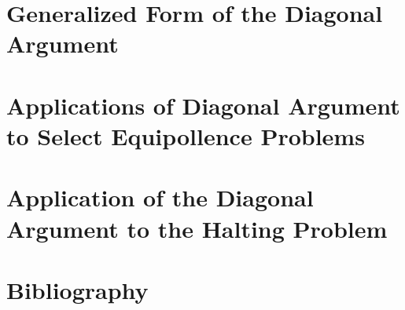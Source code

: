 \documentclass[12pt]{article}
\theoremstyle{plain}
\theoremstyle{definition}
\begin{document}
\section{Generalized Form of the Diagonal Argument}

\section{Applications of Diagonal Argument to Select Equipollence Problems}

\section{Application of the Diagonal Argument to the Halting Problem}

\section{Bibliography}



\end{document}
